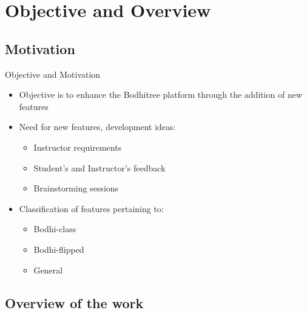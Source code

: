 \documentclass[xcolor=table]{beamer}
\begin{document}
\section{Objective and Overview}

\subsection{Motivation}

\begin{frame}{Objective and Motivation}
	\begin{itemize}
		\item Objective is to enhance the Bodhitree platform through the addition of new features
		\item Need for new features, development ideas:
		\begin{itemize}
			\item Instructor requirements
			\item Student's and Instructor's feedback
			\item Brainstorming sessions
		\end{itemize}
		\item Classification of features pertaining to:
		\begin{itemize}
			\item Bodhi-class
			\item Bodhi-flipped
			\item General
		\end{itemize}
	\end{itemize}
\end{frame}

\subsection{Overview of the work}
\end{document}
